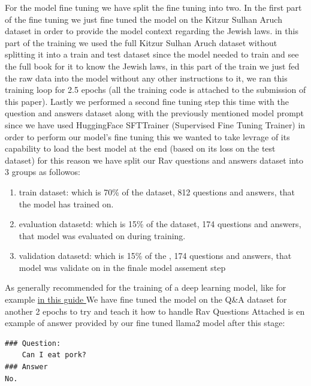 \documentclass[11pt]{article}
\begin{document}
For the model fine tuning we have split the fine tuning into two.
In the first part of the fine tuning we just fine tuned the model on the Kitzur Sulhan Aruch dataset in order to provide the model context regarding the Jewish laws. in this part of the training we used the full Kitzur Sulhan Aruch dataset without splitting it into a train and test dataset since the model needed to train and see the full book for it to know the Jewish laws, in this part of the train we just fed the raw data into the model without any other instructions to it, we ran this training loop for 2.5 epochs (all the training code is attached to the submission of this paper).
Lastly we performed a second fine tuning step this time with the question and answers dataset along with the previously mentioned model prompt since we have used HuggingFace SFTTrainer (Supervised Fine Tuning Trainer) in order to perform our model's fine tuning this we wanted to take levrage of its capability to load the best model at the end (based on its loss on the test dataset) for this reason we have split our Rav questions and answers dataset into 3 groups as followos: 
\begin{enumerate}
    \item train dataset: which is 70\% of the dataset, 812 questions and answers, that the model has trained on.
    \item evaluation datasetd: which is 15\% of the dataset, 174 questions and answers, that model was evaluated on during training.
    \item validation datasetd: which is 15\% of the , 174 questions and answers, that model was validate on in the finale model assement step 
\end{enumerate}
As generally recommended for the training of a deep learning model, like for example \href{https://encord.com/blog/train-val-test-split/#:~:text=Training%2C%20Validation%2C%20and%20Test%20Set%3A%20Key%20Takeaways,-Here%20are%20the&text=The%20optimal%20split%20ratio%20depends,10%2D20%25%20test%20data. }{in this guide }
We have fine tuned the model on the Q\&A dataset for another 2 epochs to try and teach it how to handle Rav Questions
Attached is en example of answer provided by our fine tuned llama2 model after this stage:
\begin{verbatim}
### Question:
    Can I eat pork?
### Answer
No.
\end{verbatim}
\end{document}
